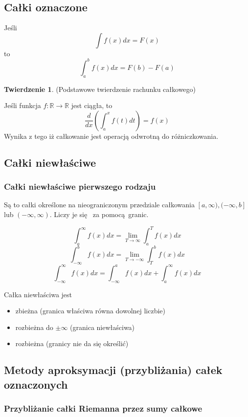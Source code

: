 \documentclass{article}
\theoremstyle{definition}
\theoremstyle{definition}
\newtheorem{tw}{Twierdzenie}[subsection]
\theoremstyle{definition}
\begin{document}
\subsection{Całki oznaczone}
Jeśli
$$
\int f(x) dx = F(x)
$$
to
$$
\int_a^b f(x) dx = F(b) - F(a)
$$

\begin{tw}
(Podstawowe twierdzenie rachunku całkowego)

Jeśli funkcja $f: \mathbb{R} \to \mathbb{R}$ jest ciągła, to
$$
\frac{d}{dx} \left(
                    \int_a^x f(t) dt 
             \right)
             = f(x)
$$
Wynika z tego iż całkowanie jest operacją odwrotną do różniczkowania.
\end{tw}

\subsection{Całki niewłaściwe}

\subsubsection{Całki niewłaściwe pierwszego rodzaju}

Są to całki określone na nieograniczonym przedziale całkowania
$[a, \infty),(-\infty, b]$ lub $(-\infty,\infty)$. Liczy je się 
za pomocą granic.

$$
\int_a^{\infty} f(x) dx = \lim_{T \to \infty} \int_a^T f(x) dx
$$
$$
\int_{-\infty}^b f(x) dx = \lim_{T \to -\infty} \int_T^b f(x) dx
$$
$$
\int_{-\infty}^{\infty} f(x) dx =
\int_{-\infty}^a f(x) dx + \int_a^{\infty} f(x) dx 
$$

Całka niewłaściwa jest
\begin{itemize}
\item zbieżna (granica właściwa równa dowolnej liczbie) 
\item rozbieżna do $\pm \infty$ (granica niewłaściwa)
\item rozbieżna (granicy nie da się określić)
\end{itemize}

\subsection{Metody aproksymacji (przybliżania) całek oznaczonych}

\subsubsection{Przybliżanie całki Riemanna przez sumy całkowe}
\end{document}
